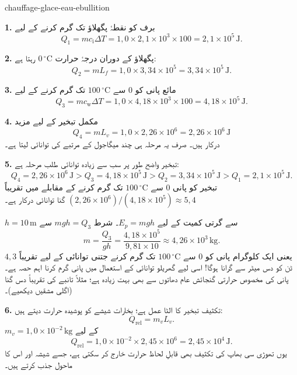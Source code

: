 \begin{exo}{chauffage-glace-eau-ebullition}
\begin{solution}
\textbf{1.} برف کو نقطۂ پگھلاؤ تک گرم کرنے کے لیے
\[
Q_1=mc_{\mathrm{i}}\Delta T
=1{,}0\times2{,}1\times10^3\times100
=2{,}1\times10^5\,\text{J}.
\]

\textbf{2.} پگھلاؤ کے دوران درجۂ حرارت $0\,{}^\circ\text{C}$ رہتا ہے:
\[
Q_2=mL_f=1{,}0\times3{,}34\times10^5=3{,}34\times10^5\,\text{J}.
\]

\textbf{3.} مائع پانی کو $0$ سے $100\,{}^\circ\text{C}$ تک گرم کرنے کے لیے
\[
Q_3=mc_{\mathrm{w}}\Delta T
=1{,}0\times4{,}18\times10^3\times100
=4{,}18\times10^5\,\text{J}.
\]

\textbf{4.} مکمل تبخیر کے لیے مزید
\[
Q_4=mL_v=1{,}0\times2{,}26\times10^6=2{,}26\times10^6\,\text{J}
\]
درکار ہیں۔ صرف یہ مرحلہ ہی چند میگاجول کے مرتبے کی توانائی لیتا ہے۔

\textbf{5.} تبخیر واضح طور پر سب سے زیادہ توانائی طلب مرحلہ ہے:
\[
Q_4=2{,}26\times10^6\,\text{J}
>Q_3=4{,}18\times10^5\,\text{J}
>Q_2=3{,}34\times10^5\,\text{J}
>Q_1=2{,}1\times10^5\,\text{J}.
\]
تبخیر کو پانی $0$ سے $100\,{}^\circ\text{C}$ تک گرم کرنے کے مقابلے میں تقریباً $(2{,}26\times10^6)/(4{,}18\times10^5)\approx5{,}4$ گنا توانائی درکار ہے۔

$h=10\,\text{m}$ سے گرتی کمیت کے لیے $E_p=mgh$۔ شرط $mgh=Q_3$ سے
\[
m=\frac{Q_3}{gh}
=\frac{4{,}18\times10^5}{9{,}81\times10}
\approx4{,}26\times10^3\,\text{kg}.
\]
یعنی ایک کلوگرام پانی کو $0$ سے $100\,{}^\circ\text{C}$ تک گرم کرنے جتنی توانائی کے لیے تقریباً $4{,}3$ ٹن کو دس میٹر سے گرانا ہوگا! اسی لیے گھریلو توانائی کے استعمال میں پانی گرم کرنا اہم حصہ ہے۔ پانی کی مخصوص حرارتی گنجائش عام دھاتوں سے بھی بہت زیادہ ہے؛ مثلاً تانبے کی تقریباً دس گنا (اگلی مشقیں دیکھیے)۔

\textbf{6.} تکثیف تبخیر کا الٹا عمل ہے؛ بخارات شیشے کو پوشیدہ حرارت دیتے ہیں:
\[
Q_{\mathrm{rel}}=m_vL_v.
\]
$m_v=1{,}0\times10^{-2}\,\text{kg}$ کے لیے
\[
Q_{\mathrm{rel}}=1{,}0\times10^{-2}\times2{,}45\times10^6
=2{,}45\times10^4\,\text{J}.
\]
یوں تھوڑی سی بھاپ کی تکثیف بھی قابلِ لحاظ حرارت خارج کر سکتی ہے، جسے شیشہ اور اس کا ماحول جذب کرتے ہیں۔
\end{solution}
\end{exo}

